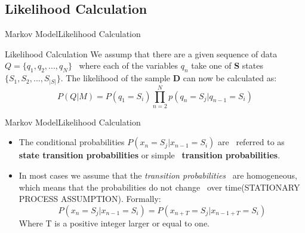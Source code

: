 \documentclass[10pt]{beamer}
\begin{document}
\subsection{Likelihood Calculation}
\begin{frame}{Markov Model}{Likelihood Calculation}
  \begin{block}{Likelihood Calculation}
  We assump that there are a given sequence of data $Q=\{q_1, q_2, ..., q_N\}$ \
  where each of the variables $q_n$ take one of \textbf{S} states $\{S_1, S_2, ..., S_{|S|}\}$.
  The likelihood of the sample \textbf{D} can now be calculated as:\\
        \begin{equation}
            P(Q|M) = P(q_1 = S_i)\displaystyle \prod_{n=2}^{N}p(q_n = S_j | q_{n-1} = S_i)
        \end{equation}
  \end{block}
\end{frame}

\begin{frame}{Markov Model}{Likelihood Calculation}
  \begin{itemize}
    \item The conditional probabilities $P(x_n = S_j | x_{n-1} = S_i)$ are \
          referred to as \textbf{state transition probabilities} or simple \
          \textbf{transition probabilities}. \cite{Anders}
    \item In most cases we assume that the \textit{transition probabilities} \
          are homogeneous, which means that the probabilities do not change \
          over time(STATIONARY PROCESS ASSUMPTION). \cite{Anders} Formally:
          \begin{equation}
               P(x_n = S_j|x_{n-1} = S_i) = P(x_{n+T} = S_j|x_{n-1+T} = S_i)
          \end{equation}
          Where T is a positive integer larger or equal to one.
  \end{itemize}
\end{frame}

\end{document}
